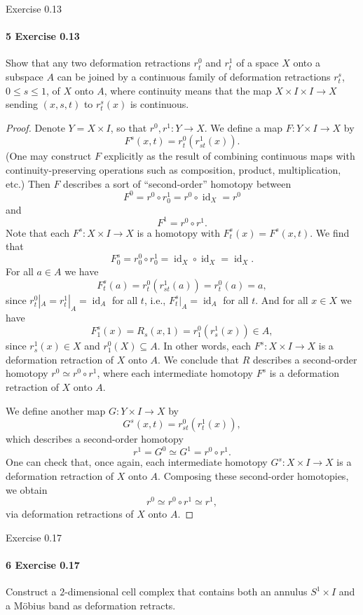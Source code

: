 \documentclass[12pt]{article}
\newlength{\myparskip}
\newenvironment{fullbox}{\begin{lrbox}{\savefullbox}\begin{minipage}{\dimexpr\textwidth-2\fboxsep\relax}\setlength{\parskip}{\myparskip}}{\end{minipage}\end{lrbox}\framebox[\textwidth]{\usebox{\savefullbox}}}
\newenvironment{pbox}[1][]{\begin{fullbox}\ifx#1\empty\else\paragraph{#1}\phantom{}\fi}{\end{fullbox}}
\theoremstyle{definition}
\newcommand{\<}{\langle}
\renewcommand{\>}{\rangle}
\newcommand{\seq}{\subseteq}
\DeclareMathOperator{\id}{id}
\newcommand{\htpy}{\simeq}
\begin{document}
\newpage
\begin{pbox}[5 Exercise 0.13]
    Show that any two deformation retractions $r^0_t$ and $r^1_t$ of a space $X$ onto a subspace $A$ can be joined by a continuous family of deformation retractions $r^s_t$, $0 \leq s \leq 1$, of $X$ onto $A$, where continuity means that the map $X \times I \times I \to X$ sending $(x, s, t)$ to $r^s_t(x)$ is continuous.
\end{pbox}

\begin{proof}
    Denote $Y = X \times I$, so that $r^0, r^1 : Y \to X$.
    We define a map $F : Y \times I \to X$ by
    \[
        F^s(x, t) = r^0_t(r^1_{st}(x)).
    \]
    (One may construct $F$ explicitly as the result of combining continuous maps with continuity-preserving operations such as composition, product, multiplication, etc.)
    Then $F$ describes a sort of ``second-order'' homotopy between
    \[
        F^0 = r^0 \circ r^1_0 = r^0 \circ \id_X = r^0
    \]
    and
    \[
        F^1 = r^0 \circ r^1.
    \]
    Note that each $F^s : X \times I \to X$ is a homotopy with $F^s_t(x) = F^s(x, t)$.
    We find that
    \[
        F^s_0 = r^0_0 \circ r^1_0 = \id_X \circ \id_X = \id_X.
    \]
    For all $a \in A$ we have
    \[
        F^s_t(a) = r^0_t(r^1_{st}(a)) = r^0_t(a) = a,
    \]
    since $r^0_t|_A = r^1_t|_A = \id_A$ for all $t$, i.e., $F^s_t|_A = \id_A$ for all $t$.
    And for all $x \in X$ we have
    \[
        F^s_1(x) = R_s(x, 1) = r^0_1(r^1_s(x)) \in A,
    \]
    since $r^1_s(x) \in X$ and $r^0_1(X) \seq A$.
    In other words, each $F^s : X \times I \to X$ is a deformation retraction of $X$ onto $A$.
    We conclude that $R$ describes a second-order homotopy $r^0 \htpy r^0 \circ r^1$, where each intermediate homotopy $F^s$ is a deformation retraction of $X$ onto $A$.

    We define another map $G : Y \times I \to X$ by
    \[
        G^s(x, t) = r^0_{st}(r^1_t(x)),
    \]
    which describes a second-order homotopy
    \[
        r^1 = G^0 \htpy G^1 = r^0 \circ r^1.
    \]
    One can check that, once again, each intermediate homotopy $G^s : X \times I \to X$ is a deformation retraction of $X$ onto $A$.
    Composing these second-order homotopies, we obtain
    \[
        r^0 \htpy r^0 \circ r^1 \htpy r^1,
    \]
    via deformation retractions of $X$ onto $A$.
\end{proof}

\newpage
\begin{pbox}[6 Exercise 0.17]
    Construct a $2$-dimensional cell complex that contains both an annulus $S^1 \times I$ and a M\"obius band as deformation retracts.
\end{pbox}
\end{document}
